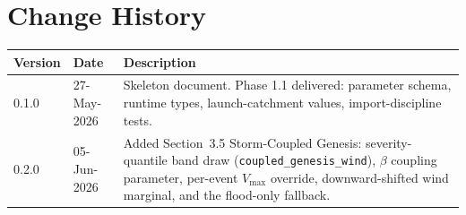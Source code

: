 \documentclass[11pt,a4paper]{article}
\begin{document}
\section{Change History}

\begin{tabular}{lll}
\toprule
Version & Date & Description \\
\midrule
0.1.0 & 27-May-2026 & Skeleton document. Phase 1.1 delivered: parameter schema, runtime types, launch-catchment values, import-discipline tests. \\
0.2.0 & 05-Jun-2026 & Added Section~3.5 Storm-Coupled Genesis: severity-quantile band draw (\texttt{coupled\_genesis\_wind}), $\beta$ coupling parameter, per-event $V_{\max}$ override, downward-shifted wind marginal, and the flood-only fallback. \\
\bottomrule
\end{tabular}
\end{document}
